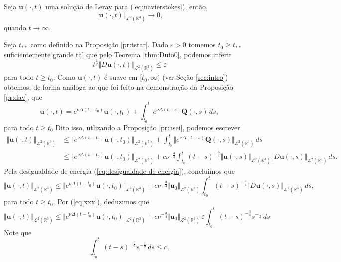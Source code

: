 \documentclass[a4paper, 11pt]{book}
\theoremstyle{definition}
\newcommand{\bR}{\mathbb{R}}
\newcommand{\bu}{\mathbf{u}}
\newcommand{\BQ}{\mathbf{Q}}
\newcommand{\cL}{\mathcal{L}}
\begin{document}
\begin{tbox} \label{thm:problema-leray}
    Seja $\bu(\cdot,t)$ uma solução de Leray para (\ref{eq:navierstokes}), então,
    \[
        \Vert \bu(\cdot,t) \Vert_{\cL^2(\bR^3)}\to 0,
    \]
    quando $t \to \infty$.
\end{tbox}
\begin{prf}
    Seja $t_{**}$ como definido na Proposição \ref{pr:tstar}.
    Dado $\varepsilon > 0$ tomemos $t_0 \geqslant t_{**}$ suficientemente grande tal que pelo Teorema \ref{thm:Duto0}, podemos inferir
    \begin{equation} \label{eq:xxx}
        t^{\frac{1}{2}} \Vert D\bu(\cdot,t) \Vert_{\cL^2(\bR^3)} \leqslant \varepsilon
    \end{equation}
    para todo $t \geqslant t_0$.
    Como $\bu(\cdot,t)$ é suave em $[t_0,\infty)$ (ver Seção \ref{sec:intro}) obtemos, de forma análoga ao que foi feito na demonstração da Proposição \ref{pr:dav}, que
    \[
        \bu(\cdot,t) = e^{\nu\Delta(t - t_0)} \bu(\cdot,t_0) + \int_{t_0}^{t} e^{\nu\Delta(t-s)}\BQ(\cdot,s) \, ds,
    \]
    para todo $t \geqslant t_0$
    Dito isso, utlizando a Proposição \ref{pr:nsei}, podemos escrever
    \[
        \begin{aligned}
            \Vert \bu(\cdot,t) \Vert_{\cL^2(\bR^3)} &\leqslant \Vert e^{\nu\Delta(t - t_0)} \bu(\cdot,t_0) \Vert_{\cL^2(\bR^3)} + \int_{t_0}^t \Vert e^{\nu\Delta(t-s)} \BQ(\cdot,s) \Vert_{\cL^2(\bR^3)}\,ds\\
            &\leqslant \Vert e^{\nu\Delta(t - t_0)} \bu(\cdot,t_0) \Vert_{\cL^2(\bR^3)} + c \nu^{-\frac{3}{4}} \int_{t_0}^t (t - s)^{-\frac{3}{4}} \Vert \bu(\cdot,s) \Vert_{\cL^2(\bR^3)} \Vert D\bu(\cdot,s) \Vert_{\cL^2(\bR^3)} \,ds.
        \end{aligned}
    \]
    Pela desigualdade de energia (\ref{eq:desigualdade-de-energia}), concluimos que
    \[
        \Vert \bu(\cdot,t) \Vert_{\cL^2(\bR^3)} \leqslant\Vert e^{\nu\Delta(t - t_0)} \bu(\cdot,t_0) \Vert_{\cL^2(\bR^3)} + c \nu^{-\frac{3}{4}} \Vert \bu_0 \Vert_{\cL^2(\bR^3)} \int_{t_0}^t (t - s)^{-\frac{3}{4}}\Vert D\bu(\cdot,s) \Vert_{\cL^2(\bR^3)} \,ds,
    \]
    para todo $t \geqslant t_0$.
    Por (\ref{eq:xxx}), deduzimos que
    \[
        \Vert \bu(\cdot,t) \Vert_{\cL^2(\bR^3)} \leqslant \Vert e^{\nu\Delta(t - t_0)} \bu(\cdot,t_0) \Vert_{\cL^2(\bR^3)} + c \nu^{-\frac{3}{4}} \Vert \bu_0 \Vert_{\cL^2(\bR^3)}\, \varepsilon \! \int_{t_0}^t (t - s)^{-\frac{3}{4}} s^{-\frac{1}{2}} \,ds.
    \]
    Note que
    \[
        \int_{t_0}^t (t - s)^{-\frac{3}{4}}s^{-\frac{1}{2}}\,ds \leqslant c,
\]
\end{prf}
\end{document}
